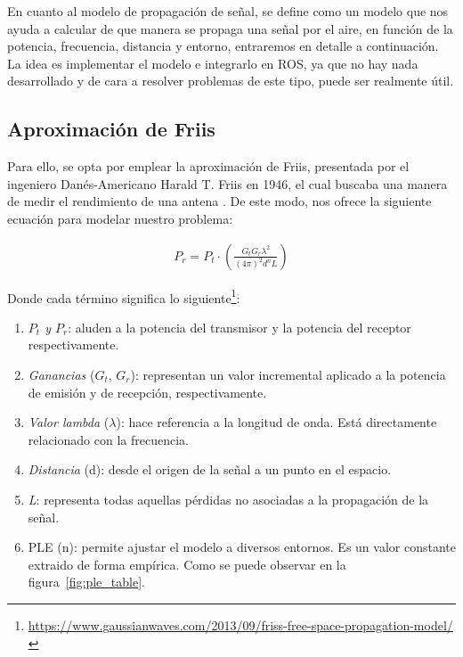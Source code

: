 En cuanto al modelo de propagación de señal, se define como un modelo que nos ayuda a calcular de que manera se propaga una señal por el aire, en función de la potencia, frecuencia, distancia y entorno, entraremos en detalle a continuación. La idea es implementar el modelo e integrarlo en \ac{ROS}, ya que no hay nada desarrollado y de cara a resolver problemas de este tipo, puede ser realmente útil.\\

\subsection{Aproximación de Friis}
\label{subsec:friis}

Para ello, se opta por emplear la aproximación de Friis, presentada por el ingeniero Danés-Americano Harald T. Friis en 1946, el cual buscaba una manera de medir el rendimiento de una antena \cite{johnson1984antenna}. De este modo, nos ofrece la siguiente ecuación para modelar nuestro problema:

\begin{align}
    P_r = P_t \cdot \left( \frac{G_t G_r \lambda^2 }{(4 \pi)^2 d^n L} \right)
\end{align}

Donde cada término significa lo siguiente\footnote[2]{\url{https://www.gaussianwaves.com/2013/09/friss-free-space-propagation-model/}}:

\begin{enumerate}
    \item \emph{$P_t$ y $P_r$}: aluden a la potencia del transmisor y la potencia del receptor respectivamente.

    \item \emph{Ganancias} ($G_t$, $G_r$): representan un valor incremental aplicado a la potencia de emisión y de recepción, respectivamente.

    \item \emph{Valor lambda} ($\lambda$): hace referencia a la longitud de onda. Está directamente relacionado con la frecuencia.

    \item \emph{Distancia} (d): desde el origen de la señal a un punto en el espacio.

    \item \emph{L}: representa todas aquellas pérdidas no asociadas a la propagación de la señal.

    \item \ac{PLE} (n): permite ajustar el modelo a diversos entornos. Es un valor constante extraido de forma empírica. Como se puede observar en la figura~\ref{fig:ple_table}.
\end{enumerate}

